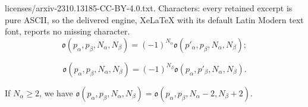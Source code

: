 \documentclass[10pt,a4paper]{amsart}
\begin{document}
licenses/arxiv-2310.13185-CC-BY-4.0.txt. Characters: every retained excerpt is pure ASCII, so the delivered engine, XeLaTeX with its default Latin Modern text font, reports no missing character.
\begin{equation}\label{eq change of orientation of witten when cross a legal in g 1 1st bdry}
\mathfrak o(p_\alpha,p_\beta,N_\alpha,N_\beta)=(-1)^{N_\alpha}\mathfrak o(p'_\alpha,p_\beta,N_\alpha,N_\beta);
\end{equation} 

\begin{equation}\label{eq change of orientation of witten when cross a legal in g 1 2nd bdry}
\mathfrak o(p_\alpha,p_\beta,N_\alpha,N_\beta)=(-1)^{N_\beta}\mathfrak o(p_\alpha,p'_\beta,N_\alpha,N_\beta).
\end{equation}

\begin{lem}
    If $N_\alpha \ge 2$, we have  $\mathfrak o(p_\alpha,p_\beta,N_\alpha,N_\beta)=\mathfrak o(p_\alpha,p_\beta,N_\alpha-2,N_\beta+2)$.
\end{lem}
\end{document}
